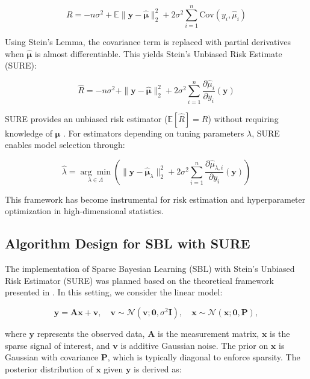 \documentclass{article}
\begin{document}
\begin{equation}
R = -n\sigma^2 + \mathbb{E}\|\mathbf{y} - \boldsymbol{\hat{\mu}}\|_2^2 + 2\sigma^2 \sum_{i=1}^n \text{Cov}(y_i, \hat{\mu}_i)
\end{equation}


Using Stein's Lemma, the covariance term is replaced with partial derivatives when $\boldsymbol{\hat{\mu}}$ is almost differentiable. This yields Stein's Unbiased Risk Estimate (SURE):

\begin{equation}
    \widehat{R} = -n\sigma^2 + \|\mathbf{y} - \boldsymbol{\hat{\mu}}\|_2^2 + 2\sigma^2 \sum_{i=1}^n \frac{\partial \hat{\mu}_i}{\partial y_i}(\mathbf{y})
\end{equation}

SURE provides an unbiased risk estimator ($\mathbb{E}[\widehat{R}] = R$) without requiring knowledge of $\boldsymbol{\mu}$ \cite{Tibshirani2015SteinS}. For estimators depending on tuning parameters $\lambda$, SURE enables model selection through:

\begin{equation}
\hat{\lambda} = \underset{\lambda \in \Lambda}{\arg\min} \left( \|\mathbf{y} - \boldsymbol{\hat{\mu}}_\lambda\|_2^2 + 2\sigma^2 \sum_{i=1}^n \frac{\partial \hat{\mu}_{\lambda,i}}{\partial y_i}(\mathbf{y}) \right)
\end{equation}


This framework has become instrumental for risk estimation and hyperparameter optimization in high-dimensional statistics.

\subsection{Algorithm Design for SBL with SURE}
The implementation of Sparse Bayesian Learning (SBL) with Stein's Unbiased Risk Estimator (SURE) was planned based on the theoretical framework presented in \cite{slockSURE}. In this setting, we consider the linear model:

\begin{equation}
    \mathbf{y} = \mathbf{A}\mathbf{x} + \mathbf{v}, \quad \mathbf{v} \sim \mathcal{N}(\mathbf{v}; \mathbf{0}, \sigma^2 \mathbf{I}), \quad \mathbf{x} \sim \mathcal{N}(\mathbf{x}; \mathbf{0}, \mathbf{P}),
\end{equation}

where $\mathbf{y}$ represents the observed data, $\mathbf{A}$ is the measurement matrix, $\mathbf{x}$ is the sparse signal of interest, and $\mathbf{v}$ is additive Gaussian noise. The prior on $\mathbf{x}$ is Gaussian with covariance $\mathbf{P}$, which is typically diagonal to enforce sparsity. The posterior distribution of $\mathbf{x}$ given $\mathbf{y}$ is derived as:
\end{document}
